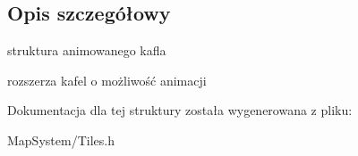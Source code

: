 \subsection{Opis szczegółowy}
struktura animowanego kafla 

rozszerza kafel o możliwość animacji 

Dokumentacja dla tej struktury została wygenerowana z pliku\-:\begin{DoxyCompactItemize}
\item 
Map\-System/Tiles.\-h\end{DoxyCompactItemize}
